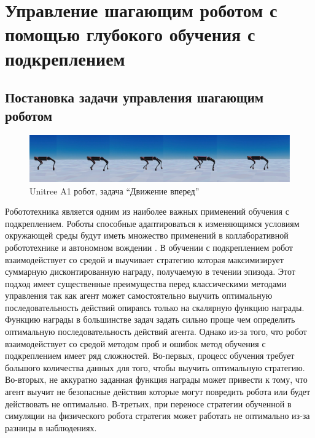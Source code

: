 \chapter{Управление шагающим роботом с помощью глубокого обучения с подкреплением}\label{ch:ch4}

\section{Постановка задачи управления шагающим роботом}


\begin{figure}[ht]
    \includegraphics[width=1\textwidth]{images/move_forward.png}
    \caption{Unitree A1 робот, задача ``Движение вперед''}
    \label{fig:mv_forward}
\end{figure}


Робототехника является одним из наиболее важных применений обучения с подкреплением. Роботы способные адаптироваться к изменяющимся условиям окружающей среды будут иметь множество применений в коллаборативной робототехнике \cite{levine2016end} и автономном вождении \cite{kiran2021deep}. В обучении с подкреплением робот взаимодействует со средой и выучивает стратегию которая максимизирует суммарную дисконтированную награду, получаемую в течении эпизода.  Этот подход имеет существенные преимущества перед классическими методами управления так как агент может самостоятельно выучить оптимальную последовательность действий опираясь только на скалярную функцию награды. Функцию награды в большинстве задач задать сильно проще чем определить оптимальную последовательность действий агента. Однако из-за того, что робот взаимодействует со средой методом проб и ошибок метод обучения с подкреплением имеет ряд сложностей. Во-первых, процесс обучения требует большого количества данных для того, чтобы выучить оптимальную стратегию. Во-вторых, не аккуратно заданная функция награды может привести к тому, что агент выучит не безопасные действия которые могут повредить робота или будет действовать не оптимально. В-третьих, при переносе стратегии обученной в симуляции на физического робота стратегия может работать не оптимально из-за разницы в наблюдениях. 

